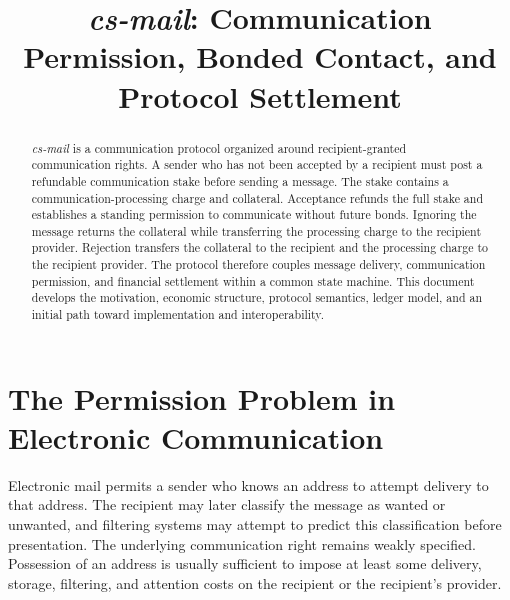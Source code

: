 \documentclass[11pt]{article}
\title{\textit{cs-mail}: Communication Permission, Bonded Contact, and Protocol Settlement}
\author{}
\date{}
\begin{document}
\maketitle

\begin{center}
\end{center}

\begin{abstract}
\textit{cs-mail} is a communication protocol organized around recipient-granted communication rights. A sender who has not been accepted by a recipient must post a refundable communication stake before sending a message. The stake contains a communication-processing charge and collateral. Acceptance refunds the full stake and establishes a standing permission to communicate without future bonds. Ignoring the message returns the collateral while transferring the processing charge to the recipient provider. Rejection transfers the collateral to the recipient and the processing charge to the recipient provider. The protocol therefore couples message delivery, communication permission, and financial settlement within a common state machine. This document develops the motivation, economic structure, protocol semantics, ledger model, and an initial path toward implementation and interoperability.
\end{abstract}

\section{The Permission Problem in Electronic Communication}

Electronic mail permits a sender who knows an address to attempt delivery to that address. The recipient may later classify the message as wanted or unwanted, and filtering systems may attempt to predict this classification before presentation. The underlying communication right remains weakly specified. Possession of an address is usually sufficient to impose at least some delivery, storage, filtering, and attention costs on the recipient or the recipient's provider.
\end{document}
